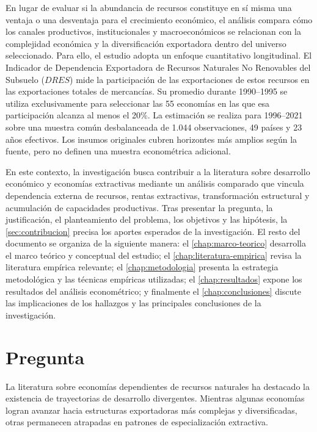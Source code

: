 \documentclass[../../TFM.tex]{subfiles}
\begin{document}
	En lugar de evaluar si la abundancia de recursos constituye en sí misma una ventaja o una desventaja para el crecimiento económico, el análisis compara cómo los canales productivos, institucionales y macroeconómicos se relacionan con la complejidad económica y la diversificación exportadora dentro del universo seleccionado. Para ello, el estudio adopta un enfoque cuantitativo longitudinal. El Indicador de Dependencia Exportadora de Recursos Naturales No Renovables del Subsuelo ($DRES$) mide la participación de las exportaciones de estos recursos en las exportaciones totales de mercancías. Su promedio durante 1990--1995 se utiliza exclusivamente para seleccionar las 55 economías en las que esa participación alcanza al menos el 20\%. La estimación se realiza para 1996--2021 sobre una muestra común desbalanceada de 1.044 observaciones, 49 países y 23 años efectivos. Los insumos originales cubren horizontes más amplios según la fuente, pero no definen una muestra econométrica adicional.

	En este contexto, la investigación busca contribuir a la literatura sobre desarrollo económico y economías extractivas mediante un análisis comparado que vincula dependencia externa de recursos, rentas extractivas, transformación estructural y acumulación de capacidades productivas. Tras presentar la pregunta, la justificación, el planteamiento del problema, los objetivos y las hipótesis, la \autoref{sec:contribucion} precisa los aportes esperados de la investigación. El resto del documento se organiza de la siguiente manera: el \autoref{chap:marco-teorico} desarrolla el marco teórico y conceptual del estudio; el \autoref{chap:literatura-empirica} revisa la literatura empírica relevante; el \autoref{chap:metodologia} presenta la estrategia metodológica y las técnicas empíricas utilizadas; el \autoref{chap:resultados} expone los resultados del análisis econométrico; y finalmente el \autoref{chap:conclusiones} discute las implicaciones de los hallazgos y las principales conclusiones de la investigación.

	\chapter{Pregunta}
	\label{chap:pregunta}

	La literatura sobre economías dependientes de recursos naturales ha destacado la existencia de trayectorias de desarrollo divergentes. Mientras algunas economías logran avanzar hacia estructuras exportadoras más complejas y diversificadas, otras permanecen atrapadas en patrones de especialización extractiva.
\end{document}

